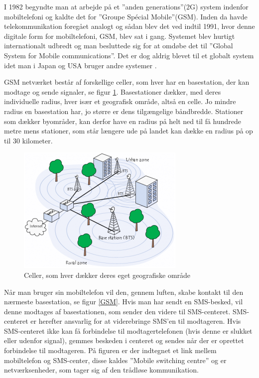 I 1982 begyndte man at arbejde på et ”anden generations”(2G) system indenfor mobiltelefoni og kaldte det for ”Groupe Spécial Mobile”(GSM). Inden da havde telekommunikation foregået analogt og sådan blev det ved indtil 1991, hvor denne digitale form for mobiltelefoni, GSM, blev sat i gang. Systemet blev hurtigt internationalt udbredt og man besluttede sig for at omdøbe det til ”Global System for Mobile communications”. Det er dog aldrig blevet til et globalt system idet man i Japan og USA bruger andre systemer \cite{denstoredanske}.

GSM netværket består af forskellige celler, som hver har en basestation, der kan modtage og sende signaler, se figur \ref{celler}. Basestationer dækker, med deres individuelle radius, hver især et geografisk område, altså en celle. Jo mindre radius en basestation har, jo større er dens tilgængelige båndbredde. Stationer som dækker byområder, kan derfor have en radius på helt ned til få hundrede metre mens stationer, som står længere ude på landet kan dække en radius på op til 30 kilometer.\cite{techviral}

\begin{figure}[H]
\includegraphics []{Billeder/celler.png}
\caption {Celler, som hver dækker deres eget geografiske område \cite{techviral}}
\label {celler}
\end{figure} 

Når man bruger sin mobiltelefon vil den, gennem luften, skabe kontakt til den nærmeste basestation, se figur \ref{GSM}. Hvis man har sendt en SMS-besked, vil denne modtages af basestationen, som sender den videre til SMS-centeret. SMS-centeret er herefter ansvarlig for at viderebringe SMS’en til modtageren. Hvis SMS-centeret ikke kan få forbindelse til modtagertelefonen (hvis denne er slukket eller udenfor signal), gemmes beskeden i centeret og sendes når der er oprettet forbindelse til modtageren. På figuren er der indtegnet et link mellem mobiltelefon og SMS-center, disse kaldes ”Mobile switching centre” og er netværksenheder, som tager sig af den trådløse kommunikation. \cite{info}

